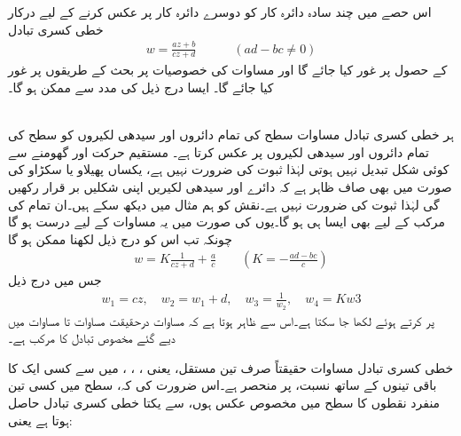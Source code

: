 اس حصے میں چند سادہ دائرہ کار کو دوسرے دائرہ کار پر عکس کرنے کے لیے درکار خطی کسری تبادل
\begin{align}\label{مساوات_نقش_مخصوص_کسری_الف}
w=\frac{az+b}{cz+d}\quad \quad \quad (ad-bc\ne 0)
\end{align}
کے حصول پر غور کیا جائے گا اور  مساوات  کی خصوصیات پر بحث کے طریقوں پر غور کیا جائے  گا۔ ایسا درج ذیل کی مدد سے ممکن ہو گا۔

\quad {}\\
ہر خطی کسری تبادل مساوات   سطح کی تمام دائروں اور سیدھی لکیروں کو  سطح کی تمام دائروں اور سیدھی لکیروں پر عکس کرتا ہے۔
\quad
مستقیم حرکت اور گھومنے سے کوئی شکل تبدیل نہیں ہوتی لہٰذا ثبوت کی ضرورت نہیں ہے، یکساں پھیلاو یا سکڑاو کی صورت میں بھی صاف ظاہر ہے کہ دائرے اور سیدھی لکیریں اپنی شکلیں بر قرار رکھیں گی لہٰذا ثبوت کی ضرورت نہیں ہے۔نقش  کو ہم مثال  میں دیکھ سکے ہیں۔ان تمام  کی مرکب کے لیے بھی ایسا ہی ہو گا۔یوں  کی صورت میں یہ مساوات  کے لیے درست ہو گا چونکہ تب اس کو درج ذیل لکھنا ممکن ہو گا
\begin{align}\label{مساوات_نقش_مرکب}
w=K\frac{1}{cz+d}+\frac{a}{c} \quad \quad (K=-\frac{ad-bc}{c})
\end{align}
جس میں درج ذیل
\begin{align*}
w_1=cz,\quad w_2=w_1+d,\quad w_3=\frac{1}{w_2},\quad w_4=Kw3
\end{align*}
پر کرتے ہوئے  لکھا جا سکتا ہے۔اس سے ظاہر ہوتا ہے کہ مساوات   درحقیقت مساوات  تا مساوات  میں دیے گئے  مخصوص تبادل کا مرکب ہے۔

خطی کسری تبادل مساوات  حقیقتاً صرف تین مستقل، یعنی ، ، ،  میں سے کسی ایک کا باقی تینوں کے ساتھ نسبت، پر منحصر ہے۔اس ضرورت کی کہ،  سطح میں کسی تین منفرد نقطوں کا  سطح میں مخصوص عکس ہوں، سے  یکتا خطی کسری تبادل حاصل ہوتا ہے یعنی:

